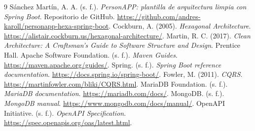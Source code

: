\documentclass[11pt,a4paper]{article}
\begin{document}
\clearpage
\begin{thebibliography}{9}
 Sánchez Martín, A. A. (s. f.). \textit{PersonAPP: plantilla de arquitectura limpia con Spring Boot}.
Repositorio de GitHub. \url{https://github.com/andres-karoll/personapp-hexa-spring-boot}.
 Cockburn, A. (2005). \textit{Hexagonal Architecture}.
\url{https://alistair.cockburn.us/hexagonal-architecture/}.
 Martin, R. C. (2017). \textit{Clean Architecture: A Craftsman's Guide to Software Structure and Design}. Prentice Hall.
 Apache Software Foundation. (s. f.). \textit{Maven Guides}.
\url{https://maven.apache.org/guides/}.
 Spring. (s. f.). \textit{Spring Boot reference documentation}.
\url{https://docs.spring.io/spring-boot/}.
 Fowler, M. (2011). \textit{CQRS}.
\url{https://martinfowler.com/bliki/CQRS.html}.
 MariaDB Foundation. (s. f.). \textit{MariaDB documentation}.
\url{https://mariadb.com/docs/}.
 MongoDB. (s. f.). \textit{MongoDB manual}.
\url{https://www.mongodb.com/docs/manual/}.
 OpenAPI Initiative. (s. f.). \textit{OpenAPI Specification}.
\url{https://spec.openapis.org/oas/latest.html}.
\end{thebibliography}
\end{document}
